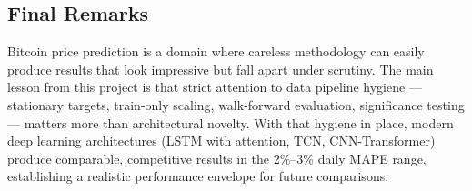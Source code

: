 \documentclass[12pt]{article}
\begin{document}
\subsection{Final Remarks}

Bitcoin price prediction is a domain where careless methodology can easily produce results that look impressive but fall apart under scrutiny. The main lesson from this project is that strict attention to data pipeline hygiene --- stationary targets, train-only scaling, walk-forward evaluation, significance testing --- matters more than architectural novelty. With that hygiene in place, modern deep learning architectures (LSTM with attention, TCN, CNN-Transformer) produce comparable, competitive results in the 2\%--3\% daily MAPE range, establishing a realistic performance envelope for future comparisons.
\end{document}
